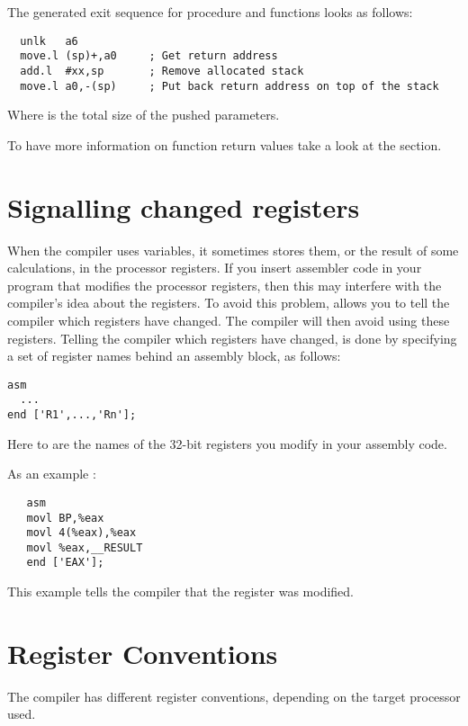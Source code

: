 \documentclass{report}
\begin{document}
The generated exit sequence for procedure and functions looks as follows:
\begin{verbatim}
  unlk   a6
  move.l (sp)+,a0     ; Get return address
  add.l  #xx,sp       ; Remove allocated stack
  move.l a0,-(sp)     ; Put back return address on top of the stack
\end{verbatim}

Where  is the total size of the pushed parameters.

To have more information on function return values take a look at the
 section.



\section{Signalling changed registers}
\label{se:RegChanges}
When the compiler uses variables, it sometimes stores them, or the result of
some calculations, in the processor registers. If you insert assembler code
in your program that modifies the processor registers, then this may
interfere with the compiler's idea about the registers. To avoid this
problem, \fpc allows you to tell the compiler which registers have changed.
The compiler will then avoid using these registers. Telling the compiler
which registers have changed, is done by specifying a set of register names
behind an assembly block, as follows:
\begin{verbatim}
asm
  ...
end ['R1',...,'Rn'];
\end{verbatim}
Here  to  are the names of the 32-bit registers you
modify in your assembly code.

As an example :
\begin{verbatim}
   asm
   movl BP,%eax
   movl 4(%eax),%eax
   movl %eax,__RESULT
   end ['EAX'];
\end{verbatim}
This example tells the compiler that the  register was modified.

\section{Register Conventions}
\label{se:RegConvs}

The compiler has different register conventions, depending on the
target processor used.
\end{document}
